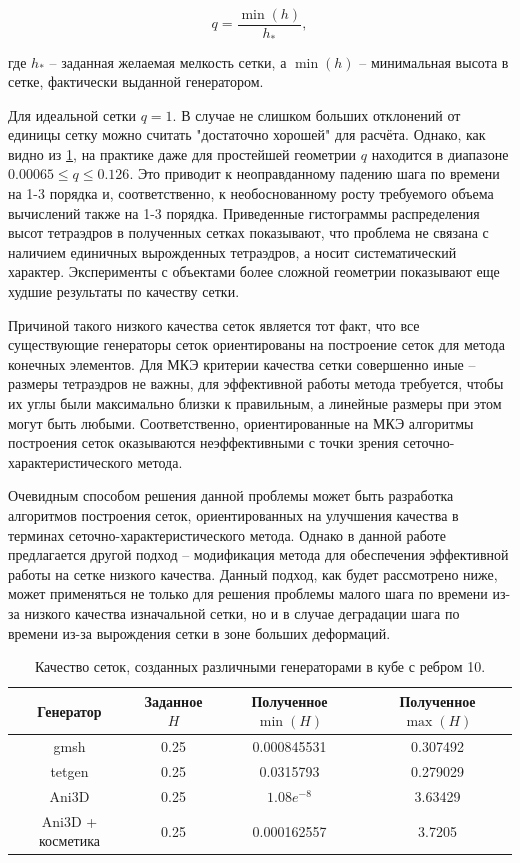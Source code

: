 \begin{equation}
q = \frac{\min(h)}{h_*},
\end{equation}

где $h_*$ -- заданная желаемая мелкость сетки, а $\min(h)$ -- минимальная высота в сетке, фактически выданной генератором.

Для идеальной сетки $q = 1$. В случае не слишком больших отклонений от единицы сетку можно считать "достаточно хорошей" для расчёта. Однако, как видно из \ref{tbl:mesh-stats-summary}, на практике даже для простейшей геометрии $q$ находится в диапазоне $0.00065 \le q \le 0.126$. Это приводит к неоправданному падению шага по времени на 1-3 порядка и, соответственно, к необоснованному росту требуемого объема вычислений также на 1-3 порядка. Приведенные гистограммы распределения высот тетраэдров в полученных сетках показывают, что проблема не связана с наличием единичных вырожденных тетраэдров, а носит систематический характер. Эксперименты с объектами более сложной геометрии показывают еще худшие результаты по качеству сетки.

Причиной такого низкого качества сеток является тот факт, что все существующие генераторы сеток ориентированы на построение сеток для метода конечных элементов. Для МКЭ критерии качества сетки совершенно иные -- размеры тетраэдров не важны, для эффективной работы метода требуется, чтобы их углы были максимально близки к правильным, а линейные размеры при этом могут быть любыми. Соответственно, ориентированные на МКЭ алгоритмы построения сеток оказываются неэффективными с точки зрения сеточно-характеристического метода.

Очевидным способом решения данной проблемы может быть разработка алгоритмов построения сеток, ориентированных на улучшения качества в терминах сеточно-характеристического метода. Однако в данной работе предлагается другой подход -- модификация метода для обеспечения эффективной работы на сетке низкого качества. Данный подход, как будет рассмотрено ниже, может применяться не только для решения проблемы малого шага по времени из-за низкого качества изначальной сетки, но и в случае деградации шага по времени из-за вырождения сетки в зоне больших деформаций.

\begin{table}[h]
\centering
\begin{tabular}{|c|c|c|c|}
\hline
Генератор & Заданное $H$ & Полученное $\min(H)$ & Полученное $\max(H)$ \\
\hline
gmsh & 0.25 & 0.000845531 & 0.307492 \\
tetgen & 0.25 & 0.0315793 & 0.279029 \\
Ani3D & 0.25 & $1.08e^{-8}$ & 3.63429 \\
Ani3D + косметика & 0.25 & 0.000162557 & 3.7205 \\
\hline
\end{tabular}
\caption{Качество сеток, созданных различными генераторами в кубе с ребром 10.}
\label{tbl:mesh-stats-summary}
\end{table}


